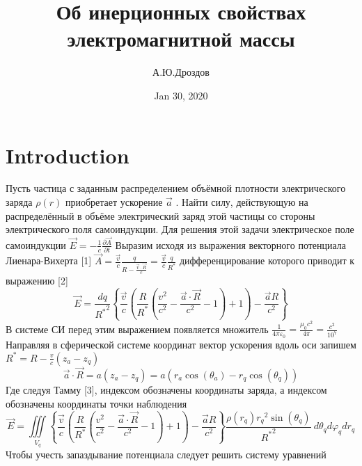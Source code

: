 ﻿\documentclass[12pt]{article}
\begin{document}
\title{Об инерционных свойствах электромагнитной массы}

\author{А.Ю.Дроздов}

\date{Jan 30, 2020}



\section{Introduction}



Пусть частица с заданным распределением объёмной плотности электрического заряда $\rho \left( r \right)$ приобретает ускорение $\overrightarrow{a}$ . Найти силу, действующую на распределённый в объёме электрический заряд этой частицы со стороны электрического поля самоиндукции. 
Для решения этой задачи электрическое поле самоиндукции $\overrightarrow{E}=-\frac{1}{c}\frac{\partial \overrightarrow{A}}{\partial t}$ 
Выразим исходя из выражения векторного потенциала Лиенара-Вихерта [1] $\overrightarrow{A}=\frac{\overrightarrow{v}}{c}\frac{q}{R-\frac{\overrightarrow{v}\cdot \overrightarrow{R}}{c}}=\frac{\overrightarrow{v}}{c}\frac{q}{{{R}^{*}}}$ дифференцирование которого приводит к выражению [2]
\[\overrightarrow{E}=\frac{dq}{{{R}^{*}}^{2}}\left\{ \frac{\overrightarrow{v}}{c}\left( \frac{R}{{{R}^{*}}}\left( \frac{{{v}^{2}}}{{{c}^{2}}}-\frac{\overrightarrow{a}\cdot \overrightarrow{R}}{{{c}^{2}}}-1 \right)+1 \right)-\frac{\overrightarrow{a}R}{{{c}^{2}}} \right\}\] 
В системе СИ перед этим выражением появляется множитель $\frac{1}{4\pi {{\varepsilon }_{0}}}=\frac{{{\mu }_{0}}{{c}^{2}}}{4\pi }=\frac{{{c}^{2}}}{{{10}^{7}}}$ 
Направляя в сферической системе координат вектор ускорения вдоль оси  запишем
${{R}^{*}}=R-\frac{v}{c}\left( {{z}_{a}}-{{z}_{q}} \right)$  
\[\overrightarrow{a}\cdot \overrightarrow{R}=a\left( {{z}_{a}}-{{z}_{q}} \right)=a\left( {{r}_{a}}\cos \left( {{\theta }_{a}} \right)-{{r}_{q}}\cos \left( {{\theta }_{q}} \right) \right)\]
Где следуя Тамму [3], индексом  обозначены координаты заряда, а индексом  обозначены координаты точки наблюдения
\[\overrightarrow{E}=\iiint\limits_{{{V}_{q}}}{\left\{ \frac{\overrightarrow{v}}{c}\left( \frac{R}{{{R}^{*}}}\left( \frac{{{v}^{2}}}{{{c}^{2}}}-\frac{\overrightarrow{a}\cdot \overrightarrow{R}}{{{c}^{2}}}-1 \right)+1 \right)-\frac{\overrightarrow{a}R}{{{c}^{2}}} \right\}\frac{\rho \left( {{r}_{q}} \right){{r}_{q}}^{2}\sin \left( {{\theta }_{q}} \right)}{{{R}^{*}}^{2}}\ }d{{\theta }_{q}}d{{\varphi }_{q}}d{{r}_{q}}\]
Чтобы учесть запаздывание потенциала следует решить систему уравнений
\end{document}

